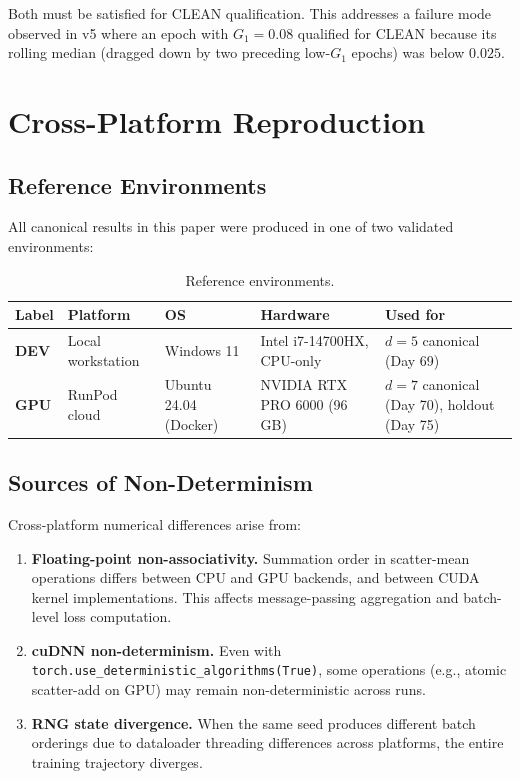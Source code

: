 Both must be satisfied for CLEAN qualification. This addresses a failure mode observed in v5 where an epoch with $G_1 = 0.08$ qualified for CLEAN because its rolling median (dragged down by two preceding low-$G_1$ epochs) was below $0.025$.
\twocolumngrid

\section{Cross-Platform Reproduction}
\label{app:repro}

\subsection{Reference Environments}

All canonical results in this paper were produced in one of two validated environments:

\begin{table}
\caption{Reference environments.}
\label{tab:environments}
\begin{ruledtabular}
\begin{tabular}{lllll}
Label & Platform & OS & Hardware & Used for \\
\hline
\textbf{DEV} & Local workstation & Windows 11 & Intel i7-14700HX, CPU-only & $d{=}5$ canonical (Day 69) \\
\textbf{GPU} & RunPod cloud & Ubuntu 24.04 (Docker) & NVIDIA RTX PRO 6000 (96\,GB) & $d{=}7$ canonical (Day 70), holdout (Day 75) \\
\end{tabular}
\end{ruledtabular}
\end{table}

\subsection{Sources of Non-Determinism}

Cross-platform numerical differences arise from:

\begin{enumerate}
\item \textbf{Floating-point non-associativity.} Summation order in scatter-mean operations differs between CPU and GPU backends, and between CUDA kernel implementations. This affects message-passing aggregation and batch-level loss computation.
\item \textbf{cuDNN non-determinism.} Even with \texttt{torch.use\_deterministic\_algorithms(True)}, some operations (e.g., atomic scatter-add on GPU) may remain non-deterministic across runs.
\item \textbf{RNG state divergence.} When the same seed produces different batch orderings due to dataloader threading differences across platforms, the entire training trajectory diverges.
\end{enumerate}

